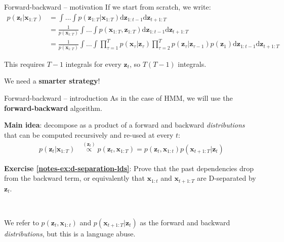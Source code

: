 \documentclass{beamer}
\newcommand{\bs}[1]{\boldsymbol{#1}}
\newcommand{\exercise}[2]{\noindent\colorbox{blue!10}{\parbox{0.995\textwidth}{\textbf{Exercise \ref{notes-ex:#1}}: #2}}\\}
\begin{document}
\begin{frame}{Forward-backward -- motivation}
If we start from scratch, we write:
{\small\begin{align*}
 p(\bs{z}_{t}|\bs{x}_{1:T}) &= \int\ldots\int p(\bs{z}_{1:T}|\bs{x}_{1:T}) \textrm{d}\bs{z}_{1:t-1}\textrm{d}\bs{z}_{t+1:T} \\
 &= \frac{1}{p(\bs{x}_{1:T})}\int\ldots\int p(\bs{x}_{1:T},\bs{z}_{1:T}) \textrm{d}\bs{z}_{1:t-1}\textrm{d}\bs{z}_{t+1:T} \\
 &= \frac{1}{p(\bs{x}_{1:T})}\int\ldots\int \prod_{\tau=1}^{T} p(\bs{x}_{\tau}|\bs{z}_{\tau}) \prod_{\tau=2}^{T} p(\bs{z}_{\tau}|\bs{z}_{\tau-1})p(\bs{z}_1) \textrm{d}\bs{z}_{1:t-1}\textrm{d}\bs{z}_{t+1:T}
\end{align*}}

This requires $T-1$ integrals for every $\bs{z}_t$, so $T(T-1)$ integrals.\vspace{3mm}

 We need a \textbf{smarter strategy}!

\end{frame}

\begin{frame}{Forward-backward -- introduction}
 As in the case of HMM, we will use the \textbf{forward-backward} algorithm.\vspace{3mm}
 
 \textbf{Main idea}: decompose as a product of a forward and backward \textit{distributions} that can be computed recursively and re-used at every $t$:
 \begin{align*}
  p(\bs{z}_t|\bs{x}_{1:T}) &\stackrel{(\bs{z}_t)}{\propto} p(\bs{z}_t,\bs{x}_{1:T}) = p(\bs{z}_t,\bs{x}_{1:t}) p(\bs{x}_{t+1:T}|\bs{z}_t)
 \end{align*}
 
\exercise{d-separation-lds}{Prove that the past dependencies drop from the backward term, or equivalently that $\bs{x}_{1:t}$ and $\bs{x}_{t+1:T}$ are D-separated by $\bs{z}_t$.}\vspace{3mm}

 We refer to $p(\bs{z}_t,\bs{x}_{1:t})$ and $p(\bs{x}_{t+1:T}|\bs{z}_t)$ as the forward and backward \textit{distributions}, but this is a language abuse.
 \end{frame}
\end{document}
